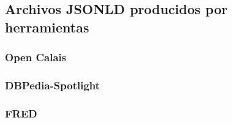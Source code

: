 \documentclass[spanish]{llncs}   %
\begin{document}
\subsection{Archivos JSONLD producidos por herramientas}

\subsubsection{Open Calais}\label{OpenCalaisJSON}
%
%
%

\subsubsection{DBPedia-Spotlight}\label{DBPediaJSON}
\subsubsection{FRED}\label{FREDJSON}
%
%
%
\end{document}
